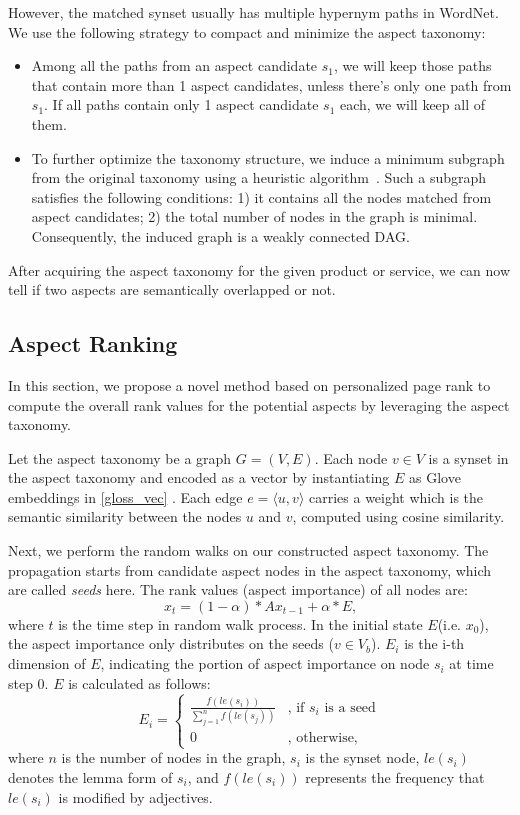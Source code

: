 \documentclass[11pt,a4paper]{article}
\begin{document}
However, the matched synset usually has multiple hypernym paths 
in WordNet. 
We use the following strategy to compact and minimize the
aspect taxonomy:
\begin{itemize}
	\item Among all the paths from an aspect candidate $s_1$, 
	we will keep those paths that contain more than 1 aspect candidates, 
	unless there's only one path from $s_1$.
	If all paths contain only 1 aspect candidate $s_1$ each, we will keep all of them.
	
	\item To further optimize the taxonomy structure, we 
	induce a minimum subgraph from the original taxonomy using
	a heuristic algorithm~\cite{kou1981fast}. Such a subgraph
	satisfies the following conditions: 
	1) it contains all the nodes matched from aspect candidates;
	2) the total number of nodes in the graph is minimal.
	Consequently, the induced graph is a weakly connected DAG.
\end{itemize}
After acquiring the aspect taxonomy for the given product or service,
we can now tell if two aspects are semantically overlapped or not. 

\subsection{Aspect Ranking}
\label{sec:rank}
In this section, we propose a novel
method based on personalized page rank 
to compute the overall rank values
for the potential aspects by leveraging the aspect taxonomy.

Let the aspect taxonomy be a graph $G=(V, E)$.
Each node $v\in V$ is a synset in the aspect taxonomy and encoded 
as a vector by instantiating $E$ as Glove embeddings in \eqref{gloss_vec} .
Each edge $e = \langle u, v \rangle$ carries a weight which is
the semantic similarity between the nodes $u$ and $v$,
computed using cosine similarity.

Next, we perform the random walks on our constructed
aspect taxonomy.
The propagation starts from candidate aspect nodes in the 
aspect taxonomy, which are called {\em seeds} here.
The rank values (aspect importance) of all nodes are:
\begin{equation}
x_t = (1-\alpha)*Ax_{t-1} + \alpha*E \text{,}
\label{eq:ppr}
\end{equation}
where $t$ is the time step in random walk process.
In the initial state $E$(i.e. $x_0$), the aspect importance only distributes on the seeds ($v\in V_b$). 
$E_i$ is the i-th dimension of $E$, indicating
the portion of aspect importance on node $s_i$ 
at time step 0.
$E$ is calculated as follows:
\begin{equation}
E_i = 
\begin{cases}
\frac{f(le(s_i))}{\sum_{j=1}^{n} f(le(s_j))} &  \text{, if $s_i$ is a seed} \\
0 &  \text{, otherwise,}
\end{cases}
\end{equation}
where $n$ is the number of nodes in the graph,
$s_i$ is the synset node,
$le(s_i)$ denotes the lemma form of $s_i$,
and $f(le(s_i))$ represents the frequency that 
$le(s_i)$ is modified by adjectives.
\end{document}
